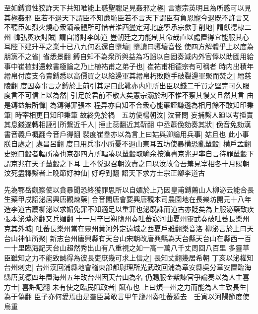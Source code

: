 至如鎛資性狡詐天下共知唯能上惑聖聰足見姦邪之極|{
	言憲宗英明且為所惑可以見其極姦邪}
臣若不退天下謂臣不知亷恥臣若不言天下謂臣有負恩寵今退既不許言又不聽臣如烈火燒心衆鏑叢體所可惜者淮西盪定河北底寧承宗歛手削地|{
	謂獻德棣二州}
韓弘輿疾討賊|{
	謂自將討李師道}
豈朝廷之力能制其命哉直以處置得宜能服其心耳陛下建升平之業十已八九何忍還自墮壞|{
	墮讀曰隳壞音怪}
使四方解體乎上以度為朋黨不之省|{
	省悉景翻}
鎛自知不為衆所與益為巧謟以自固奏減内外官俸以助國用給事中崔植封還敕書極論之乃止植祐甫之弟子也|{
	崔祐甫相德宗有可稱者}
時内出積年繒帛付度支令賣鎛悉以高價買之以給邊軍其繒帛朽敗隨手破裂邊軍聚而焚之|{
	繒慈陵翻}
度因奏事言之鎛於上前引其足曰此靴亦内庫所出臣以錢二千買之堅完可久服度言不可信上以為然|{
	引足於君前不敬大矣憲宗溺於利不惟不察其慢又且然其言}
由是鎛益無所憚|{
	為鎛得罪張本}
程异亦自知不合衆心能亷謹謙遜為相月餘不敢知印秉筆|{
	時宰相更日知印秉筆}
故終免於禍　五坊使楊朝汶|{
	汶音問}
妄捕繫人廹以考捶責其息錢遂轉相誣引所繫近千人|{
	捶止蕊翻近其靳翻}
中丞蕭俛劾奏其狀|{
	俛音免劾漢書音義戶概翻今音戶得翻}
裴度崔羣亦以為言上曰姑與卿論用兵事|{
	姑且也}
此小事朕自處之|{
	處昌呂翻}
度曰用兵事小所憂不過山東耳五坊使暴横恐亂輦轂|{
	横戶孟翻史照曰轂者輻所凑也京都四方所輻凑以輦轂取喻余按漢書京兆尹率自言待罪輦轂下謂京兆在天子輦轂之下耳}
上不悦退召朝汶責之曰以汝故令吾羞見宰相冬十月賜朝汶死盡釋繫者上晩節好神仙|{
	好呼到翻}
詔天下求方士宗正卿李道古

先為鄂岳觀察使以貪暴聞恐終獲罪思所以自媚於上乃因皇甫鎛薦山人柳泌云能合長生藥甲戌詔泌居興唐觀煉藥|{
	合音閣唐會要興唐觀本司農園地在長樂坊開元十八年造李道古薦柳泌以求媚免罪不知適足以重罪也泌既誅而道古亦貶矣為上服泌藥致疾張本泌薄必翻又兵媚翻}
十一月辛巳朔鹽州奏吐蕃寇河曲夏州靈武奏破吐蕃長樂州克其外城|{
	吐蕃長樂州當在靈州黄河外定遠城之西夏戶雅翻樂音洛}
柳泌言於上曰天台山神仙所聚|{
	新志台州唐興縣有天台山宋朝改唐興縣為天台縣天台山在縣西一百一十里臨海記天台山超然秀出山有八重視之如一高一萬八千丈周回八百里}
多靈草臣雖知之力不能致誠得為彼長吏庶幾可求上信之|{
	長知丈翻幾居希朝}
丁亥以泌權知台州刺史|{
	台州漢回浦縣地會稽東部都尉理所光武改回浦為章安縣吳分章安置臨海縣唐武德四年置海州五年改台州因天台山為名}
仍賜服金紫諫官爭論奏以為人主喜方士|{
	喜許記翻}
未有使之臨民賦政者|{
	賦布也}
上曰煩一州之力而能為人主致長生|{
	為于偽翻}
臣子亦何愛焉由是羣臣莫敢言甲午鹽州奏吐蕃遁去　壬寅以河陽節度使烏重

